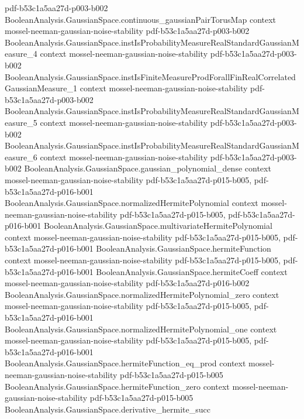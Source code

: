 \begin{theorem}
  {pdf-b53c1a5aa27d-p003-b002}
\proofstep
  {BooleanAnalysis.GaussianSpace.continuous_gaussianPairTorusMap}
  {context}
  {mossel-neeman-gaussian-noise-stability}
  {pdf-b53c1a5aa27d-p003-b002}
\proofstep
  {BooleanAnalysis.GaussianSpace.instIsProbabilityMeasureRealStandardGaussianMeasure_4}
  {context}
  {mossel-neeman-gaussian-noise-stability}
  {pdf-b53c1a5aa27d-p003-b002}
\proofstep
  {BooleanAnalysis.GaussianSpace.instIsFiniteMeasureProdForallFinRealCorrelatedGaussianMeasure_1}
  {context}
  {mossel-neeman-gaussian-noise-stability}
  {pdf-b53c1a5aa27d-p003-b002}
\proofstep
  {BooleanAnalysis.GaussianSpace.instIsProbabilityMeasureRealStandardGaussianMeasure_5}
  {context}
  {mossel-neeman-gaussian-noise-stability}
  {pdf-b53c1a5aa27d-p003-b002}
\proofstep
  {BooleanAnalysis.GaussianSpace.instIsProbabilityMeasureRealStandardGaussianMeasure_6}
  {context}
  {mossel-neeman-gaussian-noise-stability}
  {pdf-b53c1a5aa27d-p003-b002}
\proofstep
  {BooleanAnalysis.GaussianSpace.gaussian_polynomial_dense}
  {context}
  {mossel-neeman-gaussian-noise-stability}
  {pdf-b53c1a5aa27d-p015-b005,
    pdf-b53c1a5aa27d-p016-b001}
\proofstep
  {BooleanAnalysis.GaussianSpace.normalizedHermitePolynomial}
  {context}
  {mossel-neeman-gaussian-noise-stability}
  {pdf-b53c1a5aa27d-p015-b005,
    pdf-b53c1a5aa27d-p016-b001}
\proofstep
  {BooleanAnalysis.GaussianSpace.multivariateHermitePolynomial}
  {context}
  {mossel-neeman-gaussian-noise-stability}
  {pdf-b53c1a5aa27d-p015-b005,
    pdf-b53c1a5aa27d-p016-b001}
\proofstep
  {BooleanAnalysis.GaussianSpace.hermiteFunction}
  {context}
  {mossel-neeman-gaussian-noise-stability}
  {pdf-b53c1a5aa27d-p015-b005,
    pdf-b53c1a5aa27d-p016-b001}
\proofstep
  {BooleanAnalysis.GaussianSpace.hermiteCoeff}
  {context}
  {mossel-neeman-gaussian-noise-stability}
  {pdf-b53c1a5aa27d-p016-b002}
\proofstep
  {BooleanAnalysis.GaussianSpace.normalizedHermitePolynomial_zero}
  {context}
  {mossel-neeman-gaussian-noise-stability}
  {pdf-b53c1a5aa27d-p015-b005,
    pdf-b53c1a5aa27d-p016-b001}
\proofstep
  {BooleanAnalysis.GaussianSpace.normalizedHermitePolynomial_one}
  {context}
  {mossel-neeman-gaussian-noise-stability}
  {pdf-b53c1a5aa27d-p015-b005,
    pdf-b53c1a5aa27d-p016-b001}
\proofstep
  {BooleanAnalysis.GaussianSpace.hermiteFunction_eq_prod}
  {context}
  {mossel-neeman-gaussian-noise-stability}
  {pdf-b53c1a5aa27d-p015-b005}
\proofstep
  {BooleanAnalysis.GaussianSpace.hermiteFunction_zero}
  {context}
  {mossel-neeman-gaussian-noise-stability}
  {pdf-b53c1a5aa27d-p015-b005}
\proofstep
  {BooleanAnalysis.GaussianSpace.derivative_hermite_succ}

\end{theorem}
